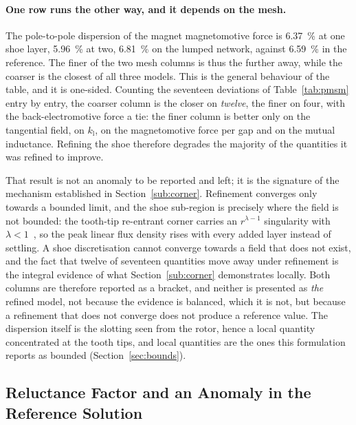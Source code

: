 \documentclass[10pt,a4paper,twocolumn]{article}
\theoremstyle{plain}
\theoremstyle{remark}
\begin{document}
\paragraph{One row runs the other way, and it depends on the mesh.}
The pole-to-pole dispersion of the magnet magnetomotive force is
\SI{6.37}{\percent} at one shoe layer, \SI{5.96}{\percent} at two,
\SI{6.81}{\percent} on the lumped network, against \SI{6.59}{\percent} in
the reference. The finer of the two mesh columns is thus the further
away, while the coarser is the closest of all three models. This is the
general behaviour of the table, and it is one-sided. Counting the
seventeen deviations of Table~\ref{tab:pmsm} entry by entry, the coarser
column is the closer on \emph{twelve}, the finer on four, with the
back-electromotive force a tie: the finer column is better only on the
tangential field, on $k_{\mathrm{l}}$, on the magnetomotive force per gap
and on the mutual inductance. Refining the shoe therefore degrades the
majority of the quantities it was refined to improve.

That result is not an anomaly to be reported and left; it is the
signature of the mechanism established in
Section~\ref{sub:corner}. Refinement converges only towards a bounded
limit, and the shoe sub-region is precisely where the field is not
bounded: the tooth-tip re-entrant corner carries an $r^{\lambda-1}$
singularity with $\lambda<1$~\cite{grisvard1985,meixner1972}, so the peak linear flux density rises with
every added layer instead of settling. A shoe discretisation cannot
converge towards a field that does not exist, and the fact that twelve
of seventeen quantities move away under refinement is the integral
evidence of what Section~\ref{sub:corner} demonstrates locally. Both
columns are therefore reported as a bracket, and neither is presented as
\emph{the} refined model, not because the evidence is balanced, which
it is not, but because a refinement that does not converge does not
produce a reference value. The dispersion itself is the slotting seen from the rotor, hence
a local quantity concentrated at the tooth tips, and local quantities
are the ones this formulation reports as bounded
(Section~\ref{sec:bounds}).





\subsection{Reluctance Factor and an Anomaly in the Reference Solution}
\label{sub:kr}
\end{document}

